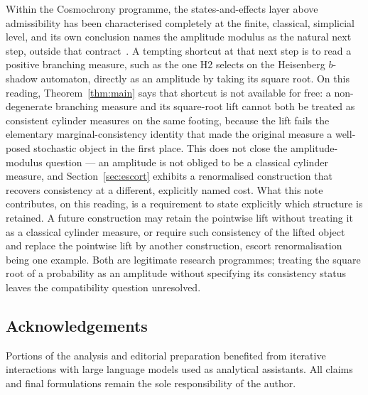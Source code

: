 \documentclass[11pt,a4paper]{article}
\theoremstyle{definition}
\theoremstyle{remark}
\begin{document}
Within the Cosmochrony programme, the states-and-effects layer above admissibility has
been characterised completely at the finite, classical, simplicial level, and its own
conclusion names the amplitude modulus as the natural next step, outside that
contract~\cite{Beau2026steft}. A tempting shortcut at that next step is to read a
positive branching measure, such as the one \textup{H2} selects on the Heisenberg
$b$-shadow automaton, directly as an amplitude by taking its square root. On this
reading, Theorem~\ref{thm:main} says that shortcut is not available for free: a
non-degenerate branching measure and its square-root lift cannot both be treated as
consistent cylinder measures on the same footing, because the lift fails the
elementary marginal-consistency identity that made the original measure a
well-posed stochastic object in the first place. This does not close the
amplitude-modulus question --- an amplitude is not obliged to be a classical cylinder
measure, and Section~\ref{sec:escort} exhibits a renormalised construction that
recovers consistency at a different, explicitly named cost. What this note contributes,
on this reading, is a requirement to state explicitly which structure is retained. A
future construction may retain the pointwise lift without treating it as a classical
cylinder measure, or require such consistency of the lifted object and replace the
pointwise lift by another construction, escort renormalisation being one example. Both
are legitimate research programmes; treating the square root of a probability as an
amplitude without specifying its consistency status leaves the compatibility question
unresolved.

\subsection*{Acknowledgements}
Portions of the analysis and editorial preparation benefited from iterative
interactions with large language models used as analytical assistants. All claims and
final formulations remain the sole responsibility of the author.

\newpage


\end{document}
